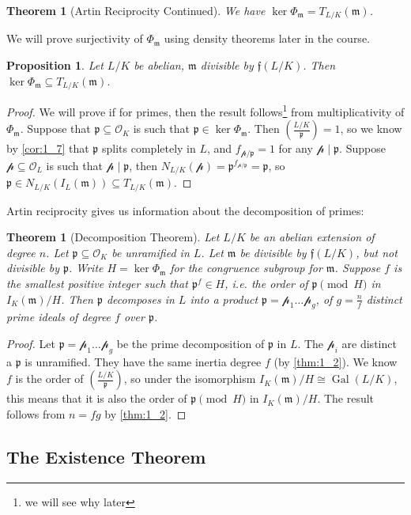 \documentclass[11pt]{article}
\theoremstyle{definition}
\theoremstyle{plain}
\newtheorem{theorem}[definition]{Theorem}
\newtheorem{proposition}[definition]{Proposition}
\theoremstyle{remark}
\DeclareMathOperator{\Gal}{Gal}
\newcommand{\cO}{\mathcal{O}}
\newcommand{\cp}{\mathcal{p}}
\newcommand{\ff}{\mathfrak{f}}
\newcommand{\fp}{\mathfrak{p}}
\newcommand{\fm}{\mathfrak{m}}
\newcommand{\leg}[2]{\left(\frac{#1}{#2}\right)}
\begin{document}
\begin{theorem}[Artin Reciprocity Continued]
    We have $\ker \Phi_\fm = T_{L/K}(\fm)$.
\end{theorem}

We will prove surjectivity of $\Phi_\fm$ using density theorems later in the course.

\begin{proposition}
    Let $L/K$ be abelian, $\fm$ divisible by $\ff(L/K)$. Then $\ker \Phi_\fm \subseteq T_{L/K}(\fm)$.
\end{proposition}
\begin{proof}
    We will prove if for primes, then the result follows\footnote{we will see why later} from multiplicativity of $\Phi_\fm$. Suppose that $\fp \subseteq \cO_K$ is such that $\fp \in \ker \Phi_\fm$. Then $\leg{L/K}{\fp} = 1$, so we know by \autoref{cor:1_7} that $\fp$ splits completely in $L$, and $f_{\cp / \fp} = 1$ for any $\cp \mid \fp$. Suppose $\cp \subseteq \cO_L$ is such that $\cp \mid \fp$, then $N_{L/K}(\cp) = \fp^{f_{\cp/\fp}} = \fp$, so $\fp \in N_{L/K}(I_L(\fm)) \subseteq T_{L/K}(\fm)$.
\end{proof}

\noindent Artin reciprocity gives us information about the decomposition of primes:

\begin{theorem}[Decomposition Theorem]\label{thm:3_10}
    Let $L/K$ be an abelian extension of degree $n$. Let $\fp \subseteq \cO_K$ be unramified in $L$. Let $\fm$ be divisible by $\ff(L/K)$, but not divisible by $\fp$. Write $H = \ker \Phi_\fm$ for the congruence subgroup for $\fm$. Suppose $f$ is the smallest positive integer such that $\fp^f \in H$, i.e. the order of $\fp \pmod{H}$ in $I_K(\fm) / H$. Then $\fp$ decomposes in $L$ into a product $\fp = \cp_1 \ldots \cp_g$, of $g = \frac{n}{f}$ distinct prime ideals of degree $f$ over $\fp$.
\end{theorem}
\begin{proof}
    Let $\fp = \cp_1 \ldots \cp_g$ be the prime decomposition of $\fp$ in $L$. The $\cp_i$ are distinct a $\fp$ is unramified. They have the same inertia degree $f$ (by \autoref{thm:1_2}). We know $f$ is the order of $\leg{L/K}{\fp}$, so under the isomorphism $I_K(\fm) / H \cong \Gal(L/K)$, this means that it is also the order of $\fp \pmod{H}$ in $I_K(\fm) / H$. The result follows from $n = fg$ by \autoref{thm:1_2}.
\end{proof}

\subsection{The Existence Theorem}
\end{document}
